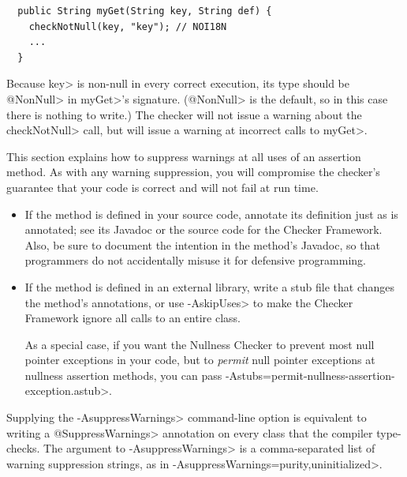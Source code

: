 \begin{Verbatim}
  public String myGet(String key, String def) {
    checkNotNull(key, "key"); // NOI18N
    ...
  }
\end{Verbatim}

\noindent
Because \<key> is non-null in every correct execution, its type should be
\<@NonNull> in \<myGet>'s signature.  (\<@NonNull> is the default, so in
this case there is nothing to write.)  The checker will not issue a warning
about the \<checkNotNull> call, but will issue a warning at incorrect calls
to \<myGet>.


This section explains how to suppress warnings at all uses of an assertion
method.  As with any warning suppression, you will compromise the checker's
guarantee that your code is correct and will not fail at run time.

\begin{itemize}
\item
  If the method is defined in your source code, annotate its definition just as
   is
  annotated; see its Javadoc or the source code for the Checker Framework.
  Also, be sure to document the intention in the method's Javadoc, so that
  programmers do not
  accidentally misuse it for defensive programming.
\item
  If the method is defined in an external library, write a stub file that
  changes the method's annotations, or use \<-AskipUses> to make the
  Checker Framework ignore all calls to an entire class.

  As a special case, if you want the Nullness Checker to prevent most null
  pointer exceptions in your code, but to \emph{permit} null pointer
  exceptions at nullness assertion methods, you can pass
  \<-Astubs=permit-nullness-assertion-exception.astub>.
\end{itemize}



Supplying the \<-AsuppressWarnings> command-line option is equivalent to
writing a \<@SuppressWarnings> annotation on every class that the compiler
type-checks.  The argument to \<-AsuppressWarnings> is a comma-separated
list of warning suppression strings, as in
\<-AsuppressWarnings=purity,uninitialized>.

